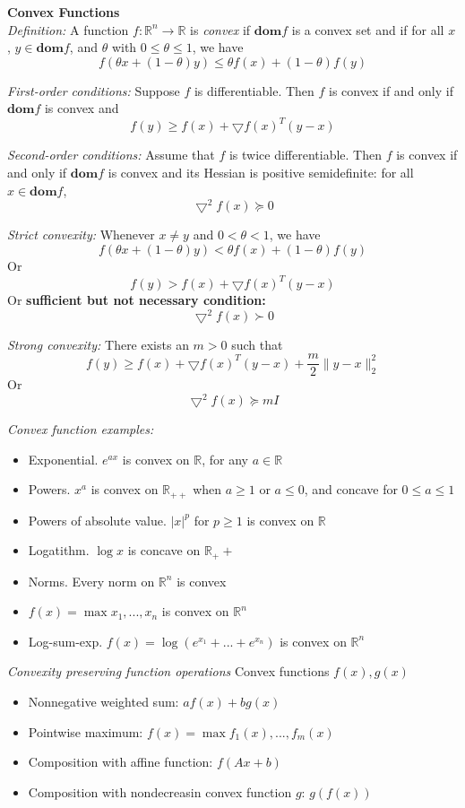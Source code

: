 \documentclass[10pt,landscape]{article}
\begin{document}
\begin{multicols}{3}
\textbf{Convex Functions} \\
\emph{Definition:} A function $f: \mathbb{R}^n \to \mathbb{R}$ is \emph{convex} if $\mathbf{dom} f$ is a convex set and if for all $x$, $y \in \mathbf{dom} f$, and $\theta$ with $0 \leq \theta \leq 1$, we have \\
$$ f(\theta x + (1 - \theta) y) \leq \theta f(x) + (1 - \theta) f(y) $$

\emph{First-order conditions:} Suppose $f$ is differentiable. Then $f$ is convex if and only if $\mathbf{dom} f$ is convex and
$$ f(y) \geq f(x) + \bigtriangledown f(x)^T (y-x) $$

\emph{Second-order conditions:} Assume that $f$ is twice differentiable. Then $f$ is convex if and only if $\mathbf{dom} f$ is convex and its Hessian is positive semidefinite: for all $x \in \mathbf{dom} f$,
$$ {\bigtriangledown}^2 f(x) \succeq 0 $$

\emph{Strict convexity:} Whenever $x \neq y$ and $0 < \theta < 1$, we have
$$ f(\theta x + (1 - \theta) y) < \theta f(x) + (1 - \theta) f(y) $$
Or
$$ f(y) > f(x) + \bigtriangledown f(x)^T (y-x) $$
Or \textbf{sufficient but not necessary condition:}
$$ {\bigtriangledown}^2 f(x) \succ 0 $$

\emph{Strong convexity:} There exists an $m > 0$ such that
$$ f(y) \geq f(x) + \bigtriangledown f(x)^T (y-x) + \frac{m}{2} \| y-x \|_2^2 $$
Or
$$ \bigtriangledown^2 f(x) \succeq mI $$

\emph{Convex function examples:}
\begin{itemize}
	\item Exponential. $e^{ax}$ is convex on $\mathbb{R}$, for any $a \in \mathbb{R}$
	\item Powers. $x^a$ is convex on $\mathbb{R}_{++}$ when $a \geq 1$ or $a \leq 0$, and concave for $0 \leq a \leq 1$
	\item Powers of absolute value. $|x|^p$ for $p \geq 1$ is convex on $\mathbb{R}$
	\item Logatithm. $\log x$ is concave on $\mathbb{R}_++$
	\item Norms. Every norm on $\mathbb{R}^n$ is convex
	\item $f(x) = \max{x_1, ... , x_n}$ is convex on $\mathbb{R}^n$
	\item Log-sum-exp. $f(x) = \log(e^{x_1} + ... + e^{x_n})$ is convex on $\mathbb{R}^n$
\end{itemize}

\emph{Convexity preserving function operations}
Convex functions $f(x), g(x)$
\begin{itemize}
	\item Nonnegative weighted sum: $a f(x) + b g(x)$
	\item Pointwise maximum: $f(x) = \max{f_1(x), ... , f_m(x)}$
	\item Composition with affine function: $f(Ax+b)$
	\item Composition with nondecreasin convex function $g$: $g(f(x))$
\end{itemize}






\end{multicols}
\end{document}
